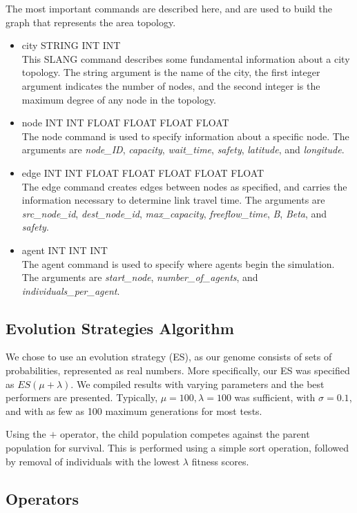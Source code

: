 \documentclass{sig-alternate-05-2015}
\begin{document}
			The most important commands are described here, and are used to build the graph that represents the area topology.
			\begin{itemize}
				\item city STRING INT INT\\
				This SLANG command describes some fundamental information about a city topology. The string argument is the name of the city, the first integer argument indicates the number of nodes, and the second integer is the maximum degree of any node in the topology.
				\item node INT INT FLOAT FLOAT FLOAT FLOAT\\
				The node command is used to specify information about a specific node. The arguments are \emph{node\_ID}, \emph{capacity}, \emph{wait\_time}, \emph{safety}, \emph{latitude}, and \emph{longitude}.
				\item edge INT INT FLOAT FLOAT FLOAT FLOAT FLOAT\\
				The edge command creates edges between nodes as specified, and carries the information necessary to determine link travel time. The arguments are \emph{src\_node\_id}, \emph{dest\_node\_id}, \emph{max\_capacity}, \emph{freeflow\_time}, \emph{B}, \emph{Beta}, and \emph{safety}.
				\item agent INT INT INT\\
				The agent command is used to specify where agents begin the simulation. The arguments are \emph{start\_node}, \emph{number\_of\_agents}, and \emph{individuals\_per\_agent}.
			\end{itemize}
		\subsection{Evolution Strategies Algorithm}
			We chose to use an evolution strategy (ES), as our genome consists of sets of probabilities, represented as real numbers. More specifically, our ES was specified as $ES(\mu + \lambda)$. We compiled results with varying parameters and the best performers are presented. Typically, $\mu = 100, \lambda = 100$ was sufficient, with $\sigma = 0.1$, and with as few as 100 maximum generations for most tests. 
			
			Using the $+$ operator, the child population competes against the parent population for survival. This is performed using a simple sort operation, followed by removal of individuals with the lowest $\lambda$ fitness scores.
			\subsection{Operators}
\end{document}

